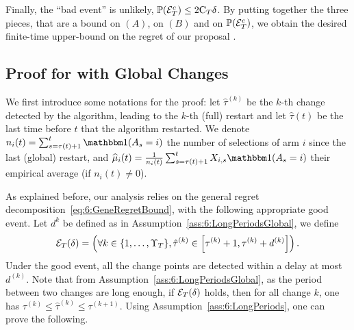 Finally, the ``bad event'' is unlikely, $\mathbb{P}(\mathcal{E}_T^c) \leq 2\mathrm{C}_T \delta$.
By putting together the three pieces, that are a bound on $(A)$, on $(B)$ and on $\mathbb{P}(\mathcal{E}_T^c)$, we obtain the desired finite-time upper-bound on the regret of our proposal \GLRklUCB.





\subsection{Proof for \GLRklUCB{} with Global Changes}
\label{proof:6:mainRegretBoundGlobal}





We first introduce some notations for the proof:
let $\widehat{\tau}^{(k)}$ be the $k$-th change detected by the algorithm, leading to the $k$-th (full) restart and let $\widehat{\tau}(t)$ be the last time before $t$ that the algorithm restarted.
We denote $n_i(t) = \sum_{s=\tau(t)+1}^{t}\indic(A_s = i)$ the number of selections of arm $i$ since the last (global) restart, and $\widehat{\mu}_i(t) = \frac{1}{n_i(t)}\sum_{s=\tau(t)+1}^{t}X_{i,s}\indic(A_s = i)$ their empirical average (if $n_i(t) \neq 0$).

As explained before, our analysis relies on the general regret decomposition~\eqref{eq:6:GeneRegretBound}, with the following appropriate good event. Let $d^k$ be defined as in Assumption~\ref{ass:6:LongPeriodsGlobal}, we define
\begin{equation}\mathcal{E}_T(\delta) = \left( \forall k \in \{1, \ldots, \Upsilon_T\}, \hat{\tau}^{(k)} \in \left[\tau^{(k)} + 1, \tau^{(k)} + d^{(k)}\right] \right).\label{def:6:GoodEvenGlobal}\end{equation}
Under the good event, all the change points are detected within a delay at most $d^(k)$.
%
Note that from Assumption~\ref{ass:6:LongPeriodsGlobal}, as the period between two changes are long enough, if $\mathcal{E}_T(\delta)$ holds, then for all change $k$, one has $\tau^{(k)} \leq \hat{\tau}^{(k)} \leq \tau^{(k+1)}$. Using Assumption~\ref{ass:6:LongPeriods}, one can prove the following.

